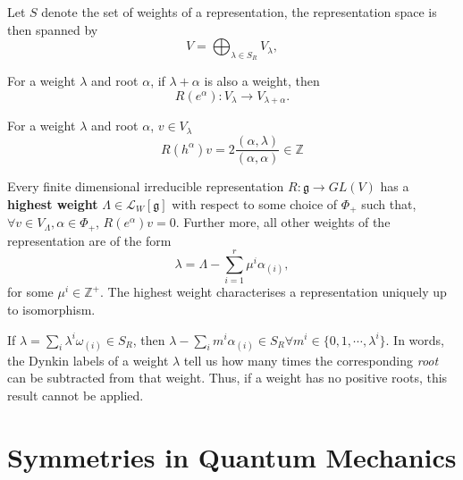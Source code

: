 \documentclass[11pt,fleqn,final]{article}
\begin{document}
\begin{prop}
\begin{ronumerate}
\item Let $S$ denote the set of weights of a representation, the representation space is then spanned by
\begin{equation}\label{eq:CrudeWeightSpan}
V = \bigoplus_{\lambda \in S_R} V_\lambda,
\end{equation}
\item For a weight $\lambda$ and root $\alpha$, if $\lambda + \alpha$ is also a weight, then
\begin{equation}
R(e^\alpha) : V_\lambda \to V_{\lambda + \alpha}.
\end{equation}
\item For a weight $\lambda$ and root $\alpha$, $v \in V_\lambda$
\begin{equation}
R(h^\alpha)v = 2\frac{(\alpha, \lambda)}{(\alpha, \alpha)} \in \mathbb{Z}
\end{equation}
\end{ronumerate}
\end{prop}

\begin{prop}
Every finite dimensional irreducible representation $R:\mathfrak{g} \to GL(V)$ has a \textbf{highest weight} $\Lambda \in \mathcal{L}_W[\mathfrak{g}]$ with respect to some choice of $\Phi_+$ such that, $\forall v \in V_{\Lambda}, \alpha \in \Phi_+$, $R(e^\alpha) v = 0$. Further more, all other weights of the representation are of the form
\begin{equation}\label{eq:weightSpan}
\lambda = \Lambda - \sum_{i=1}^r \mu^i \alpha_{(i)},
\end{equation}
for some $\mu^i \in \mathbb{Z}^+$. The highest weight characterises a representation uniquely up to isomorphism.
\end{prop}

\begin{prop}
If $\lambda = \sum_i \lambda^i \omega_{(i)} \in S_R$, then $\lambda - \sum_i m^i \alpha_{(i)} \in S_R \forall m^i \in \{0, 1, \cdots, \lambda^i \}$. In words, the Dynkin labels of a weight $\lambda$ tell us how many times the corresponding \textit{root} can be subtracted from that weight. Thus, if a weight has no positive roots, this result cannot be applied.
\end{prop}

\section{Symmetries in Quantum Mechanics}
\end{document}
